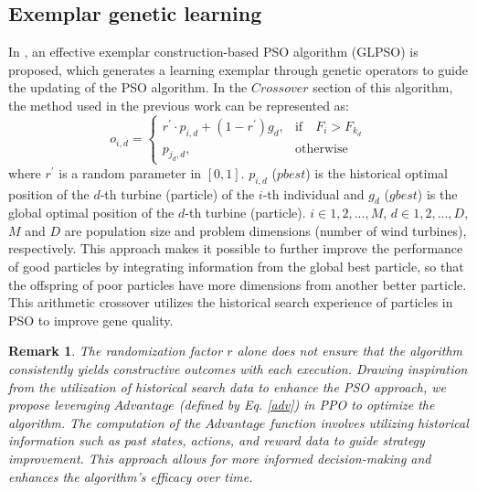 \documentclass[review]{elsarticle}
\newtheorem{remark}{Remark}
\begin{document}
\subsection{Exemplar genetic learning}
In \cite{gong2015genetic, lei2023chaotic}, an effective exemplar construction-based PSO algorithm (GLPSO) is proposed, which generates a learning exemplar through genetic operators to guide the updating of the PSO algorithm. In the $Crossover$ section of this algorithm, the method used in the previous work can be represented as:
\begin{equation}
	\label{exem}
	o_{i,d} =
	\begin{cases}
		r^{\prime}\cdot p_{i,d}+(1-r^{\prime})g_{d}, & \text{if}\quad F_{i}>F_{k_{d}} \\
		p_{j_{d},d}, & \text{otherwise}
	\end{cases}
\end{equation}
where $r^{\prime}$ is a random parameter in $[0, 1]$. $p_{i, d}$ ($pbest$) is the historical optimal position of the $d$-th turbine (particle) of the $i$-th individual and $g_{d}$ ($gbest$) is the global optimal position of the $d$-th turbine (particle). $i \in {1, 2,..., M}$, $d \in {1, 2,..., D}$, $M$ and $D$ are population size and problem dimensions (number of wind turbines), respectively. This approach makes it possible to further improve the performance of good particles by integrating information from the global best particle, so that the offspring of poor particles have more dimensions from another better particle. This arithmetic crossover utilizes the historical search experience of particles in PSO to improve gene quality.
\begin{remark}
	\emph{The randomization factor $r$ alone does not ensure that the algorithm consistently yields constructive outcomes with each execution. Drawing inspiration from the utilization of historical search data to enhance the PSO approach, we propose leveraging $Advantage$ (defined by Eq. \eqref{adv}) in PPO to optimize the algorithm. The computation of the $Advantage$ function involves utilizing historical information such as past states, actions, and reward data to guide strategy improvement. This approach allows for more informed decision-making and enhances the algorithm's efficacy over time.}
\end{remark}
\end{document}
